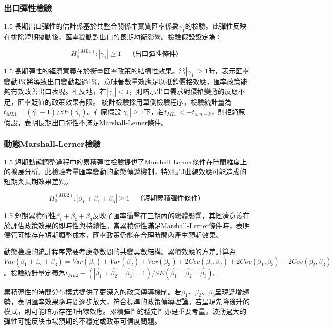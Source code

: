 \documentclass[a4paper,12pt]{article}
\begin{document}
\subsubsection{出口彈性檢驗}
\begin{spacing}{1.5}
長期出口彈性的估計係基於共整合關係中實質匯率係數$\gamma_1$的檢驗。此彈性反映在排除短期擾動後，匯率變動對出口的長期均衡影響。檢驗假設設定為：
\end{spacing}

\begin{equation}
H_0^{(ML1)}: |\gamma_1| \geq 1 \quad \text{（出口彈性條件）} \label{eq:ml_export}
\end{equation}

\begin{spacing}{1.5}
長期彈性的經濟意義在於衡量匯率政策的結構性效果。當$|\gamma_1| \geq 1$時，表示匯率變動1\%將導致出口變動超過1\%，意味著數量效應足以抵銷價格效應，匯率政策能夠有效改善出口表現。相反地，若$|\gamma_1| < 1$，則暗示出口需求對價格變動的反應不足，匯率貶值的政策效果有限。
統計檢驗採用單側檢驗程序，檢驗統計量為$t_{ML1} = (\hat{\gamma_1} - 1)/SE(\hat{\gamma_1})$。在原假設$|\gamma_1| \geq 1$下，若$t_{ML1} < -t_{\alpha, n-k}$，則拒絕原假設，表明長期出口彈性不滿足Marshall-Lerner條件。
\end{spacing}
\vspace{-0.5cm}
\subsubsection{動態Marshall-Lerner檢驗}
\begin{spacing}{1.5}
短期動態調整過程中的累積彈性檢驗提供了Marshall-Lerner條件在時間維度上的擴展分析。此檢驗考量匯率變動的動態傳遞機制，特別是J曲線效應可能造成的短期與長期效果差異。
\end{spacing}

\begin{equation}
H_0^{(ML2)}: |\beta_1 + \beta_2 + \beta_3| \geq 1 \quad \text{（短期累積彈性條件）} \label{eq:ml_dynamic}
\end{equation}
\begin{spacing}{1.5}
短期累積彈性$\beta_1 + \beta_2 + \beta_3$反映了匯率衝擊在三期內的總體影響，其經濟意義在於評估政策效果的即時性與持續性。當累積彈性滿足Marshall-Lerner條件時，表明儘管可能存在短期調整成本，匯率政策仍能在合理時間內產生預期效果。

動態檢驗的統計程序需要考慮參數間的共變異數結構。累積效應的方差計算為$Var(\beta_1 + \beta_2 + \beta_3) = Var(\beta_1) + Var(\beta_2) + Var(\beta_3) + 2Cov(\beta_1, \beta_2) + 2Cov(\beta_1, \beta_3) + 2Cov(\beta_2, \beta_3)$。檢驗統計量定義為$t_{ML2} = (|\hat{\beta_1} + \hat{\beta_2} + \hat{\beta_3}| - 1)/SE(\hat{\beta_1} + \hat{\beta_2} + \hat{\beta_3})$。

累積彈性的時間分布模式提供了更深入的政策傳導機制。若$\beta_1$、$\beta_2$、$\beta_3$呈現遞增趨勢，表明匯率效果隨時間逐步放大，符合標準的政策傳導理論。若呈現先降後升的模式，則可能暗示存在J曲線效應。累積彈性的穩定性亦是重要考量，波動過大的彈性可能反映市場預期的不穩定或政策可信度問題。
\end{spacing}
\end{document}
